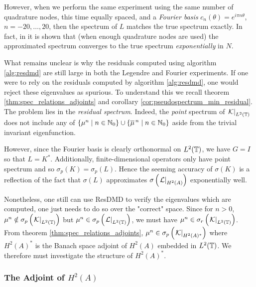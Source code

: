 However, when we perform the same experiment using the same number of quadrature nodes, 
this time equally spaced, and a \emph{Fourier basis} $c_n (\theta) = e^{i \pi n \theta}$, 
$n = -20, \ldots, 20$, then the spectrum of $L$ matches the true spectrum exactly. In fact, 
in \cite{Slipantschuk3} it is shown that (when enough quadrature nodes are used) the 
approximated spectrum converges to the true spectrum \emph{exponentially} in $N$. 

What remains unclear is why the residuals computed using algorithm \ref{alg:resdmd} are 
still large in both the Legendre and Fourier experiments. If one were to rely on the 
residuals computed by algorithm \ref{alg:resdmd}, one would reject these eigenvalues as 
spurious. To understand this we recall theorem 
\ref{thm:spec_relations_adjoints} and corollary \ref{cor:pseudospectrum_min_residual}. 
The problem lies in the \emph{residual spectrum}. Indeed, the \emph{point} spectrum of 
$\left. \mathcal{K} \right|_{L^2(\mathbb{T})}$ does not include any of 
$\left\{ \mu^n \mid n \in \mathbb{N}_0 \right\} \cup \left\{ \overline{\mu}^{\,n} \mid n \in \mathbb{N}_0 \right\}$
aside from the trivial invariant eigenfunction. 

However, since the Fourier basis is clearly orthonormal on $L^2(\mathbb{T})$, we have 
$G = I$ so that $L = K^*$. Additionally, finite-dimensional operators only have point 
spectrum and so $\sigma_p (K) = \sigma_p (L)$. Hence the seeming accuracy of 
$\sigma (K)$ is a reflection of the fact that $\sigma (L)$ approximates 
$\sigma \left( \left. \mathcal{L} \right|_{H^2(A)} \right)$ exponentially well. 

Nonetheless, one still can use ResDMD to verify the eigenvalues which are computed, 
one just needs to do so over the "correct" space. Since for $n > 0$, 
$\mu^n \notin \sigma_p \left( \left. \mathcal{K} \right|_{L^2(\mathbb{T})} \right)$ but 
$\mu^n \in \sigma_p \left( \left. \mathcal{L} \right|_{L^2(\mathbb{T})} \right)$, we must have 
$\mu^n \in \sigma_r \left( \left. \mathcal{K} \right|_{L^2(\mathbb{T})} \right)$. From theorem 
\ref{thm:spec_relations_adjoints}, 
$\mu^n \in \sigma_p \left( \left. \mathcal{K} \right|_{H^2 (A)^*} \right)$ where 
$H^2 (A)^*$ is the Banach space adjoint of $H^2 (A)$ embedded in $L^2 (\mathbb{T})$. We 
therefore must investigate the structure of $H^2 (A)^*$. 

\subsubsection{The Adjoint of $H^2 (A)$}\label{sec:blaschke_hardy}

